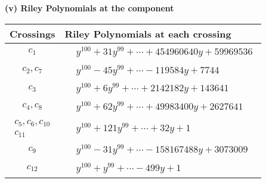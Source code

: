 \documentclass[1p]{elsarticle_modified}
\theoremstyle{definition}
\begin{document}
\newpage\renewcommand{\arraystretch}{1}
\flushleft \textbf{(v) Riley Polynomials at the component}\newline \\
\begin{tabular}{m{50pt}|m{274pt}}
Crossings & \hspace{64pt}Riley Polynomials at each crossing \\
\hline $$\begin{aligned}c_{1}\end{aligned}$$&$\begin{aligned}
&y^{100}+31 y^{99}+\cdots+454960640 y+59969536
\end{aligned}$\\
\hline $$\begin{aligned}c_{2},c_{7}\end{aligned}$$&$\begin{aligned}
&y^{100}-45 y^{99}+\cdots-119584 y+7744
\end{aligned}$\\
\hline $$\begin{aligned}c_{3}\end{aligned}$$&$\begin{aligned}
&y^{100}+6 y^{99}+\cdots+2142182 y+143641
\end{aligned}$\\
\hline $$\begin{aligned}c_{4},c_{8}\end{aligned}$$&$\begin{aligned}
&y^{100}+62 y^{99}+\cdots+49983400 y+2627641
\end{aligned}$\\
\hline $$\begin{aligned}c_{5},c_{6},c_{10}\\c_{11}\end{aligned}$$&$\begin{aligned}
&y^{100}+121 y^{99}+\cdots+32 y+1
\end{aligned}$\\
\hline $$\begin{aligned}c_{9}\end{aligned}$$&$\begin{aligned}
&y^{100}-31 y^{99}+\cdots-158167488 y+3073009
\end{aligned}$\\
\hline $$\begin{aligned}c_{12}\end{aligned}$$&$\begin{aligned}
&y^{100}+y^{99}+\cdots-499 y+1
\end{aligned}$\\
\hline
\end{tabular}\\~\\
\end{document}
